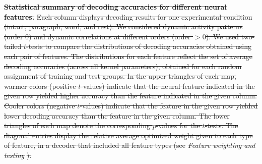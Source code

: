 \documentclass[english]{article}
\providecommand{\DIFdeltex}[1]{{\protect\color{red}\sout{#1}}}                      %
\providecommand{\DIFdelFL}[1]{\DIFdel{#1}} %
\providecommand{\DIFdel}[1]{\texorpdfstring{\DIFdeltex{#1}}{}} %
\begin{document}
{%
\textbf{\DIFdelFL{Statistical summary of decoding accuracies for
    different neural features.}}  %
\DIFdelFL{Each column displays decoding
  results for one experimental condition (intact, paragraph, word, and
  rest).  We considered dynamic activity patterns (order 0) and
  dynamic correlations at different orders (order $> 0$).  We used
  two-tailed $t$-tests to compare the
  distributions of decoding accuracies obtained using each pair of
  features.  The distributions for each feature reflect the set of
  average decoding accuracies (across all kernel parameters), obtained
  for each random assignment of training and test groups.
  In the upper triangles of each map, warmer colors (positive $t$-values) indicate that the
  neural feature indicated in the given row yielded higher accuracy than the
  feature indicated in the given column.  Cooler colors (negative
  $t$-values) indicate that
  the feature in the given row yielded lower decoding accuracy than
  the feature in the given column.  The lower triangles of each map
  denote the corresponding $p$-values for the $t$-tests.  The diagonal
  entries display the relative average optimized weight given to each type of feature, in
  a decoder that included all feature types (see }\textit{\DIFdelFL{Feature
    weighting and testing}}%
\DIFdelFL{).}}
\end{document}
